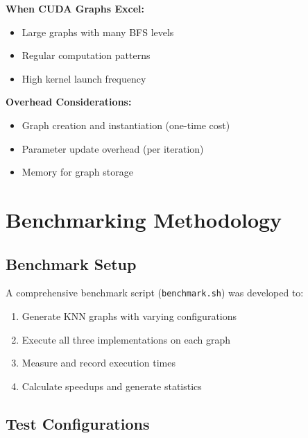 \documentclass[11pt,a4paper]{article}
\begin{document}
\textbf{When CUDA Graphs Excel:}
\begin{itemize}
    \item Large graphs with many BFS levels
    \item Regular computation patterns
    \item High kernel launch frequency
\end{itemize}

\textbf{Overhead Considerations:}
\begin{itemize}
    \item Graph creation and instantiation (one-time cost)
    \item Parameter update overhead (per iteration)
    \item Memory for graph storage
\end{itemize}

\section{Benchmarking Methodology}

\subsection{Benchmark Setup}

A comprehensive benchmark script (\texttt{benchmark.sh}) was developed to:

\begin{enumerate}
    \item Generate KNN graphs with varying configurations
    \item Execute all three implementations on each graph
    \item Measure and record execution times
    \item Calculate speedups and generate statistics
\end{enumerate}

\subsection{Test Configurations}
\end{document}
